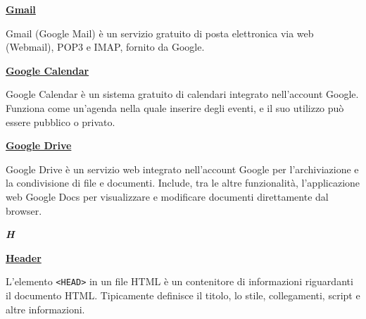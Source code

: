 \bigskip
\begin{addmargin}[0em]{0em}	
	\textbf{\underline{Gmail}}
\end{addmargin}

\medskip
\begin{addmargin}[5em]{1em}	
Gmail (Google Mail) è un servizio gratuito di posta elettronica via web (Webmail), POP3 e IMAP, fornito da Google.
\end{addmargin}	

\bigskip
\begin{addmargin}[0em]{0em}
	\textbf{\underline{Google Calendar}}
\end{addmargin}

\medskip
\begin{addmargin}[5em]{1em}	
Google Calendar è un sistema gratuito di calendari integrato nell'account Google.
Funziona come un'agenda nella quale inserire degli eventi, e il suo utilizzo può essere pubblico o privato.
\end{addmargin}

\bigskip
\begin{addmargin}[0em]{0em}
	\textbf{\underline{Google Drive}}
\end{addmargin}

\medskip
\begin{addmargin}[5em]{1em}	
Google Drive è un servizio web integrato nell'account Google per l'archiviazione e la condivisione di file e documenti.
Include, tra le altre funzionalità,  l'applicazione web Google Docs per visualizzare e modificare documenti direttamente 
dal browser.	
\end{addmargin}	

\newpage

\cleardoublepage
{}
{}
\noindent\hrulefill\hspace{4mm}\textbf{\textsl{\Huge{H}}}\hspace{4mm}\hrulefill

\vspace*{2\bigskipamount}



\begin{addmargin}[0em]{0em}	
	\textbf{\underline{Header}}
\end{addmargin}

\medskip
\begin{addmargin}[5em]{1em}		
	L'elemento \texttt{<HEAD>} in un file HTML è un contenitore di informazioni riguardanti il documento HTML. Tipicamente definisce il titolo, lo stile, collegamenti, script e altre informazioni.
\end{addmargin}	

